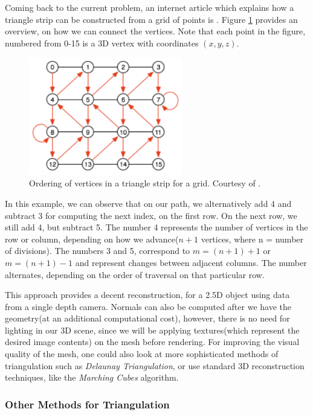 \documentclass[]{article}
\begin{document}
Coming back to the current problem, an internet article which explains how a triangle strip can be constructed from a grid of points is \cite{triangleStrip}. Figure \ref{fig:TriangleStrip} provides an overview, on how we can connect the vertices. Note that each point in the figure, numbered from 0-15 is a 3D vertex with coordinates $(x,y,z)$. 

\begin{figure}[hbtp]
    \centering
    \includegraphics[width=0.6\textwidth]{figures/TriangleStripOrdering.PNG}
    \caption{Ordering of vertices in a triangle strip for a grid. Courtesy of \cite{triangleStrip}.}
    \label{fig:TriangleStrip}
\end{figure}

In this example, we can observe that on our path, we alternatively add 4 and subtract 3 for computing the next index, on the first row. On the next row, we still add 4, but subtract 5. The number 4 represents the number of vertices in the row or column, depending on how we advance($n + 1$ vertices, where n = number of divisions).
The numbers 3 and 5, correspond to $m = (n+1) + 1$ or $m = (n+1) - 1$ and represent changes between adjacent columns. The number alternates, depending on the order of traversal on that particular row.

This approach provides a decent reconstruction, for a 2.5D object using data from a single depth camera. Normals can also be computed after we have the geometry(at an additional computational cost), however, there is no need for lighting in our 3D scene, since we will be applying textures(which represent the desired image contents) on the mesh before rendering. For improving the visual quality of the mesh, one could also look at more sophisticated methods of triangulation such as \textit{Delaunay Triangulation}, or use standard 3D reconstruction techniques, like the \textit{Marching Cubes} algorithm.

\subsubsection{Other Methods for Triangulation}
\end{document}
